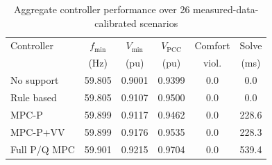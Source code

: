 \begin{table}[!t]
\caption{Aggregate controller performance over 26 measured-data-calibrated scenarios}
\label{tab:controller_summary}
\centering
\begin{tabular}{lccccc}
\toprule
Controller & $f_{\min}$ & $V_{\min}$ & $V_{\mathrm{PCC}}$ & Comfort & Solve \\
 & (Hz) & (pu) & (pu) & viol. & (ms) \\
\midrule
No support & 59.805 & 0.9001 & 0.9399 & 0.0 & 0.0 \\
Rule based & 59.805 & 0.9107 & 0.9500 & 0.0 & 0.0 \\
MPC-P & 59.899 & 0.9117 & 0.9462 & 0.0 & 228.6 \\
MPC-P+VV & 59.899 & 0.9176 & 0.9535 & 0.0 & 228.3 \\
Full P/Q MPC & 59.901 & 0.9215 & 0.9704 & 0.0 & 539.4 \\
\bottomrule
\end{tabular}
\end{table}
